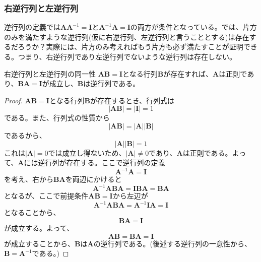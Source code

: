 \subsubsection{右逆行列と左逆行列}
逆行列の定義では\(\boldsymbol{A}\boldsymbol{A}^{-1}=\boldsymbol{I}\)と\(\boldsymbol{A}^{-1}\boldsymbol{A}=\boldsymbol{I}\)の両方が条件となっている。では、片方のみを満たすような逆行列(仮に右逆行列、左逆行列と言うこととする)は存在するだろうか？実際には、片方のみ考えればもう片方も必ず満たすことが証明できる。つまり、右逆行列であり左逆行列でないような逆行列は存在しない。
\begin{theorem*}{右逆行列と左逆行列の同一性}
	\(\boldsymbol{A}\boldsymbol{B}=\boldsymbol{I}\)となる行列\(\boldsymbol{B}\)が存在すれば、\(\boldsymbol{A}\)は正則であり、\(\boldsymbol{B}\boldsymbol{A}=\boldsymbol{I}\)が成立し、\(\boldsymbol{B}\)は逆行列である。
\end{theorem*}
\begin{proof}
	\(\boldsymbol{A}\boldsymbol{B}=\boldsymbol{I}\)となる行列\(\boldsymbol{B}\)が存在するとき、行列式は
	\begin{equation}
		|\boldsymbol{A}\boldsymbol{B}|=|\boldsymbol{I}|=1
	\end{equation}
	である。また、行列式の性質から
	\begin{equation}
		|\boldsymbol{A}\boldsymbol{B}|=|\boldsymbol{A}||\boldsymbol{B}|
	\end{equation}
	であるから、
	\begin{equation}
		|\boldsymbol{A}||\boldsymbol{B}|=1
	\end{equation}
	これは\(|\boldsymbol{A}|=0\)では成立し得ないため、\(|\boldsymbol{A}|\neq0\)であり、\(\boldsymbol{A}\)は正則である。よって、\(\boldsymbol{A}\)には逆行列が存在する。ここで逆行列の定義
	\begin{equation}
		\boldsymbol{A}^{-1}\boldsymbol{A}=\boldsymbol{I}
	\end{equation}
	を考え、右から\(\boldsymbol{B}\boldsymbol{A}\)を両辺にかけると
	\begin{equation}
		\boldsymbol{A}^{-1}\boldsymbol{A}\boldsymbol{B}\boldsymbol{A}=\boldsymbol{I}\boldsymbol{B}\boldsymbol{A}=\boldsymbol{B}\boldsymbol{A}
	\end{equation}
	となるが、ここで前提条件\(\boldsymbol{A}\boldsymbol{B}=\boldsymbol{I}\)から左辺が
	\begin{equation}
		\boldsymbol{A}^{-1}\boldsymbol{A}\boldsymbol{B}\boldsymbol{A}=\boldsymbol{A}^{-1}\boldsymbol{I}\boldsymbol{A}=\boldsymbol{I}
	\end{equation}
	となることから、
	\begin{equation}
		\boldsymbol{B}\boldsymbol{A}=\boldsymbol{I}
	\end{equation}
	が成立する。よって、
	\begin{equation}
		\boldsymbol{A}\boldsymbol{B}=\boldsymbol{B}\boldsymbol{A}=\boldsymbol{I}
	\end{equation}
	が成立することから、\(\boldsymbol{B}\)は\(\boldsymbol{A}\)の逆行列である。(後述する逆行列の一意性から、\(\boldsymbol{B}=\boldsymbol{A}^{-1}\)である。)
\end{proof}
